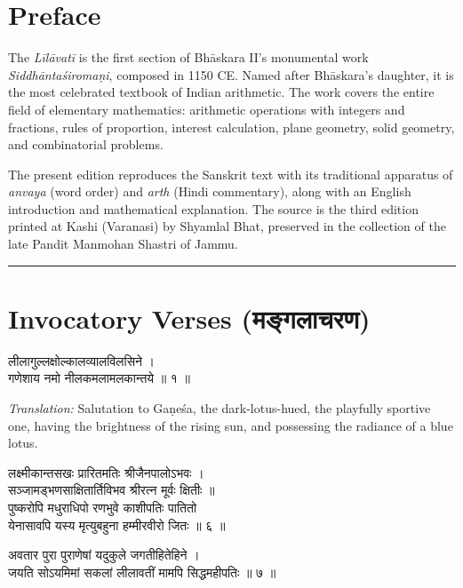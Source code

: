\documentclass[11pt,a4paper]{book}
\newcommand{\longline}{\noindent\rule{\textwidth}{0.4pt}}
\newenvironment{sanskritverse}{
  \begin{center}
  \begin{minipage}{0.92\textwidth}
  \devanagarifont
  \centering
}{
  \end{minipage}
  \end{center}
  \vspace{0.5em}
}
\begin{document}
\chapter*{Preface}

The \textit{Līlāvatī} is the first section of Bhāskara II's monumental work \textit{Siddhāntaśiromaṇi}, composed in 1150 CE. Named after Bhāskara's daughter, it is the most celebrated textbook of Indian arithmetic. The work covers the entire field of elementary mathematics: arithmetic operations with integers and fractions, rules of proportion, interest calculation, plane geometry, solid geometry, and combinatorial problems.

The present edition reproduces the Sanskrit text with its traditional apparatus of \textit{anvaya} (word order) and \textit{arth} (Hindi commentary), along with an English introduction and mathematical explanation. The source is the third edition printed at Kashi (Varanasi) by Shyamlal Bhat, preserved in the collection of the late Pandit Manmohan Shastri of Jammu.

\longline

\chapter*{Invocatory Verses (मङ्गलाचरण)}

\begin{sanskritverse}
लीलागुल्लक्षोल्कालव्यालविलसिने ।\\
गणेशाय नमो नीलकमलामलकान्तये ॥ १ ॥
\end{sanskritverse}

\textit{Translation:} Salutation to Gaṇeśa, the dark-lotus-hued, the playfully sportive one, having the brightness of the rising sun, and possessing the radiance of a blue lotus.

\begin{sanskritverse}
लक्ष्मीकान्तसखः प्रारितमतिः श्रीजैनपालोऽभवः ।\\
सञ्जामड्भणसाक्षितार्तिविभव श्रीरत्न मूर्वः क्षितीः ॥\\
पुष्करोपि मधुराधिपो रणभुवे काशीपतिः पातितो\\
येनासावपि यस्य मृत्युबहुना हम्मीरवीरो जितः ॥ ६ ॥
\end{sanskritverse}

\begin{sanskritverse}
अवतार पुरा पुराणेषां यदुकुले जगतीहितेहिने ।\\
जयति सोऽयमिमां सकलां लीलावतीं मामपि सिद्धमहीपतिः ॥ ७ ॥
\end{sanskritverse}
\end{document}
